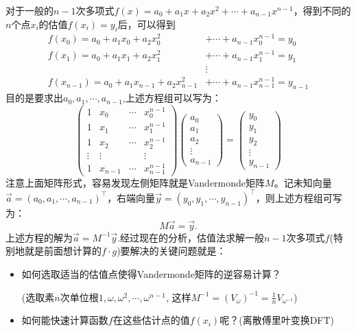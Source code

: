 \documentclass[10pt]{ctexart}
\begin{document}
对于一般的$n-1$次多项式$f(x) = a_0 + a_1 x + a_2 x^2 + \cdots + a_{n-1} x^{n-1}$，得到不同的$n$个点$x_i$的估值$f(x_i) = y_i$后，可以得到
\begin{displaymath}
    \begin{aligned}
        f(x_0) = a_0 + a_1 x_0 + a_2 x_0^2 & + \cdots + a_{n-1} x_0^{n-1} = y_0 \\
        f(x_1) = a_0 + a_1 x_1 + a_2 x_1^2 & + \cdots + a_{n-1} x_1^{n-1} = y_1 \\
        & \vdots \\
        f(x_{n-1}) = a_0 + a_1 x_{n-1} + a_2 x_{n-1}^2 & + \cdots + a_{n-1} x_{n-1}^{n-1} = y_{n-1}
    \end{aligned}
\end{displaymath}
目的是要求出$a_0,a_1,\cdots, a_{n-1}$,上述方程组可以写为：
\begin{displaymath}
    \left(
    \begin{matrix}
        1 & x_0 & \cdots & x_0^{n-1} \\
        1 & x_1 & \cdots & x_1^{n-1} \\
        1 & x_2 & \cdots & x_2^{n-1} \\
        \vdots & \vdots & & \vdots \\
        1 & x_{n-1} & \cdots & x_{n-1}^{n-1} 
    \end{matrix}\right)
    \left(\begin{matrix}
        a_0 \\
        a_1 \\
        a_2 \\
        \vdots \\
        a_{n-1}
    \end{matrix}\right)
    = \left(\begin{matrix}
        y_0 \\
        y_1 \\
        y_2 \\
        \vdots \\
        y_{n-1}
    \end{matrix}\right)
\end{displaymath}
注意上面矩阵形式，容易发现左侧矩阵就是Vandermonde矩阵$M$。记未知向量$\vec{a} = (a_0, a_1, \cdots, a_{n-1})^{\intercal}$，右端向量$\vec{y} =(y_0,y_1,\cdots, y_{n-1})^{\intercal}$，则上述方程组可写为：
$$
M\vec{a}=\vec{y}.
$$
上述方程的解为$\vec{a} = M^{-1} \vec{y}$.经过现在的分析，估值法求解一般$n-1$次多项式$f$(特别地就是前面想计算的$f \cdot g$)要解决的关键问题就是：
\begin{itemize}
    \item {\color{red}如何选取适当的估值点使得Vandermonde矩阵的逆容易计算？}
    
    {\color{blue}(选取素$n$次单位根$1, \omega, \omega^2, \cdots, \omega^{n-1}$, 这样$M^{-1} = (V_{\omega})^{-1} = \frac{1}{n} V_{\omega^{-1}} $)}

    \item {\color{red}如何能快速计算函数$f$在这些估计点的值$f(x_i)$呢？}{\color{blue}(离散傅里叶变换DFT)}
\end{itemize}
\end{document}
